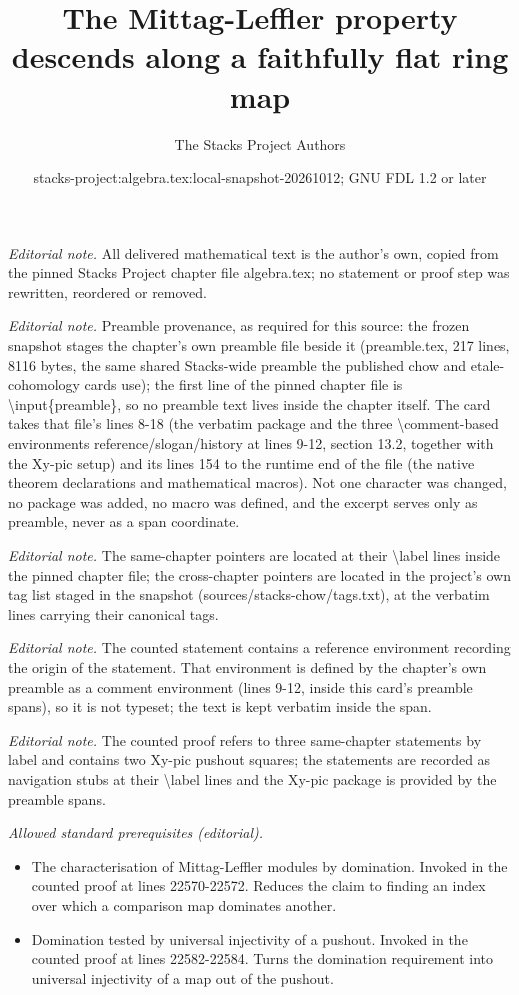 \documentclass[10pt,a4paper]{amsart}
\title{The Mittag-Leffler property descends along a faithfully flat ring map}
\author{The Stacks Project Authors}
\date{stacks-project:algebra.tex:local-snapshot-20261012; GNU FDL 1.2 or later}
\theoremstyle{plain}
\theoremstyle{definition}
\theoremstyle{remark}
\numberwithin{equation}{subsection}
\begin{document}
\maketitle
\noindent\textit{Editorial note.} All delivered mathematical text is the author's own, copied from the pinned Stacks Project chapter file algebra.tex; no statement or proof step was rewritten, reordered or removed.\par\medskip
\noindent\textit{Editorial note.} Preamble provenance, as required for this source: the frozen snapshot stages the chapter's own preamble file beside it (preamble.tex, 217 lines, 8116 bytes, the same shared Stacks-wide preamble the published chow and etale-cohomology cards use); the first line of the pinned chapter file is \textbackslash{}input\{preamble\}, so no preamble text lives inside the chapter itself. The card takes that file's lines 8-18 (the verbatim package and the three \textbackslash{}comment-based environments reference/slogan/history at lines 9-12, section 13.2, together with the Xy-pic setup) and its lines 154 to the runtime end of the file (the native theorem declarations and mathematical macros). Not one character was changed, no package was added, no macro was defined, and the excerpt serves only as preamble, never as a span coordinate.\par\medskip
\noindent\textit{Editorial note.} The same-chapter pointers are located at their \textbackslash{}label lines inside the pinned chapter file; the cross-chapter pointers are located in the project's own tag list staged in the snapshot (sources/stacks-chow/tags.txt), at the verbatim lines carrying their canonical tags.\par\medskip
\noindent\textit{Editorial note.} The counted statement contains a reference environment recording the origin of the statement. That environment is defined by the chapter's own preamble as a comment environment (lines 9-12, inside this card's preamble spans), so it is not typeset; the text is kept verbatim inside the span.\par\medskip
\noindent\textit{Editorial note.} The counted proof refers to three same-chapter statements by label and contains two Xy-pic pushout squares; the statements are recorded as navigation stubs at their \textbackslash{}label lines and the Xy-pic package is provided by the preamble spans.\par\medskip
\noindent\textit{Allowed standard prerequisites (editorial).}\begin{itemize}
\item The characterisation of Mittag-Leffler modules by domination. Invoked in the counted proof at lines 22570-22572. Reduces the claim to finding an index over which a comparison map dominates another.
\item Domination tested by universal injectivity of a pushout. Invoked in the counted proof at lines 22582-22584. Turns the domination requirement into universal injectivity of a map out of the pushout.
\end{itemize}\medskip
\end{document}
